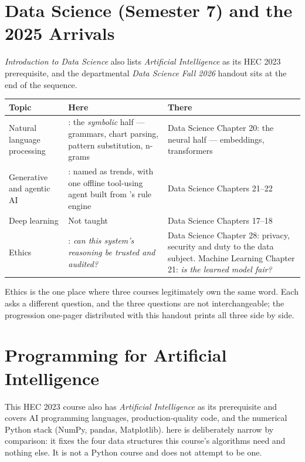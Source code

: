 \section{Data Science (Semester 7) and the 2025 Arrivals}

\emph{Introduction to Data Science} also lists \emph{Artificial Intelligence} as
its HEC 2023 prerequisite, and the departmental \emph{Data Science Fall 2026}
handout sits at the end of the sequence.

\begin{longtable}{@{}L{4.6cm}L{4.6cm}L{5.4cm}@{}}
\toprule
{}
\textbf{Topic} & \textbf{Here} & \textbf{There} \\
\midrule
\endhead
Natural language processing & : the \emph{symbolic} half ---
grammars, chart parsing, pattern substitution, n-grams & Data Science Chapter 20:
the neural half --- embeddings, transformers \\
Generative and agentic AI & : named as trends, with one offline
tool-using agent built from 's rule engine & Data Science
Chapters 21--22 \\
Deep learning & Not taught & Data Science Chapters 17--18 \\
Ethics & : \emph{can this system's reasoning be trusted and
audited?} & Data Science Chapter 28: privacy, security and duty to the data
subject. Machine Learning Chapter 21: \emph{is the learned model fair?} \\
\bottomrule
\end{longtable}

Ethics is the one place where three courses legitimately own the same word. Each
asks a different question, and the three questions are not interchangeable; the
progression one-pager distributed with this handout prints all three side by side.

\section{Programming for Artificial Intelligence}

This HEC 2023 course also has \emph{Artificial Intelligence} as its prerequisite
and covers AI programming languages, production-quality code, and the numerical
Python stack (NumPy, pandas, Matplotlib).  here is deliberately
narrow by comparison: it fixes the four data structures this course's algorithms
need and nothing else. It is not a Python course and does not attempt to be one.

